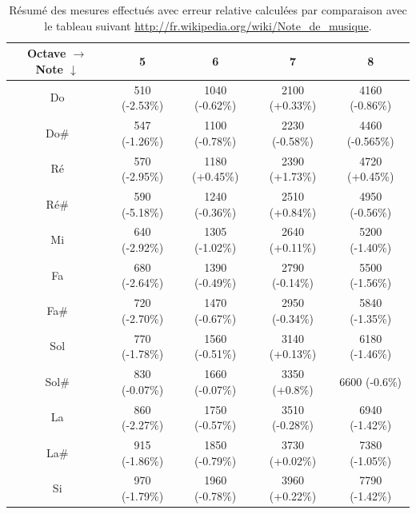 \begin{table}[ht]
	\centering
		\begin{tabular}{|c|c|c|c|c|}
			\hline
				\specialcell{Octave $\rightarrow$ \\ Note $\downarrow$} & 5 & 6 & 7 & 8 \\
			\hline
				 Do & \unit{510}{\milli\volt} (-2.53\%) & \unit{1040}{\milli\volt} (-0.62\%) & \unit{2100}{\milli\volt} (+0.33\%) & \unit{4160}{\milli\volt} (-0.86\%) \\
			\hline
				 Do\# & \unit{547}{\milli\volt} (-1.26\%) & \unit{1100}{\milli\volt} (-0.78\%) & \unit{2230}{\milli\volt} (-0.58\%) & \unit{4460}{\milli\volt} (-0.565\%) \\
			\hline
				 Ré &  \unit{570}{\milli\volt} (-2.95\%) & \unit{1180}{\milli\volt} (+0.45\%) & \unit{2390}{\milli\volt} (+1.73\%) & \unit{4720}{\milli\volt} (+0.45\%) \\
			\hline
				 Ré\# & \unit{590}{\milli\volt} (-5.18\%) & \unit{1240}{\milli\volt} (-0.36\%) & \unit{2510}{\milli\volt} (+0.84\%) & \unit{4950}{\milli\volt} (-0.56\%) \\
			\hline
				 Mi & \unit{640}{\milli\volt} (-2.92\%) & \unit{1305}{\milli\volt} (-1.02\%) & \unit{2640}{\milli\volt} (+0.11\%) & \unit{5200}{\milli\volt} (-1.40\%) \\
			\hline
				 Fa & \unit{680}{\milli\volt} (-2.64\%) & \unit{1390}{\milli\volt} (-0.49\%) & \unit{2790}{\milli\volt} (-0.14\%) & \unit{5500}{\milli\volt} (-1.56\%) \\
			\hline
				 Fa\# & \unit{720}{\milli\volt} (-2.70\%) & \unit{1470}{\milli\volt} (-0.67\%) & \unit{2950}{\milli\volt} (-0.34\%) & \unit{5840}{\milli\volt} (-1.35\%) \\
			\hline
				 Sol & \unit{770}{\milli\volt} (-1.78\%) & \unit{1560}{\milli\volt} (-0.51\%) & \unit{3140}{\milli\volt} (+0.13\%) & \unit{6180}{\milli\volt} (-1.46\%) \\
			\hline
				 Sol\# & \unit{830}{\milli\volt} (-0.07\%)& \unit{1660}{\milli\volt} (-0.07\%) & \unit{3350}{\milli\volt} (+0.8\%) & \unit{6600}{\milli\volt} (-0.6\%) \\
			\hline
				 La & \unit{860}{\milli\volt} (-2.27\%) & \unit{1750}{\milli\volt} (-0.57\%) & \unit{3510}{\milli\volt} (-0.28\%) & \unit{6940}{\milli\volt} (-1.42\%) \\
			\hline
				 La\# & \unit{915}{\milli\volt} (-1.86\%) & \unit{1850}{\milli\volt} (-0.79\%) & \unit{3730}{\milli\volt} (+0.02\%) & \unit{7380}{\milli\volt} (-1.05\%) \\
			\hline
				 Si & \unit{970}{\milli\volt} (-1.79\%) & \unit{1960}{\milli\volt} (-0.78\%) & \unit{3960}{\milli\volt} (+0.22\%) & \unit{7790}{\milli\volt} (-1.42\%) \\
			\hline
		\end{tabular}
	\caption{Résumé des mesures effectués avec erreur relative calculées par comparaison avec
	le tableau suivant \url{http://fr.wikipedia.org/wiki/Note_de_musique}.}
	\label{tab:keyboard-measure-vs-theory}
\end{table}

